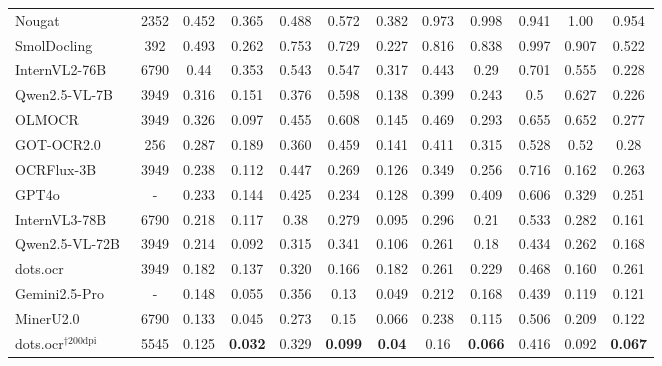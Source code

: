 \documentclass[11pt, a4paper, logo, copyright, nonumbering]{deepseek}
\begin{document}
\begin{CJK*}{UTF8}{gbsn}
\begin{table}[!t]
{\begin{tabular}{lccccccccccc}
            \midrule 
            Nougat~\cite{blecher2023nougat}& 2352 & 0.452 & 0.365 & 0.488 & 0.572 & 0.382 & 0.973 & 0.998 & 0.941 & 1.00 & 0.954\\
            SmolDocling~\cite{nassar2025smoldocling}& 392 & 0.493 & 0.262 & 0.753 & 0.729 & 0.227 & 0.816 & 0.838 & 0.997 & 0.907 & 0.522 \\
            InternVL2-76B~\cite{chen2024internvl2}& 6790 & 0.44 & 0.353 & 0.543 &  0.547 & 0.317 & 0.443 & 0.29 & 0.701 & 0.555 & 0.228  \\
            Qwen2.5-VL-7B~\cite{Qwen2.5-VL}& 3949 & 0.316 & 0.151 & 0.376 & 0.598 & 0.138 & 0.399 & 0.243 & 0.5 & 0.627 & 0.226 \\
            OLMOCR~\cite{poznanski2025olmocr}& 3949 & 0.326 & 0.097 & 0.455 & 0.608 & 0.145 & 0.469 & 0.293 & 0.655 & 0.652 & 0.277 \\
            GOT-OCR2.0~\cite{wei2024general}& 256 & 0.287 & 0.189 & 0.360 & 0.459 & 0.141 & 0.411 & 0.315 & 0.528 & 0.52 & 0.28 \\
            OCRFlux-3B~\cite{ocrflux}& 3949 & 0.238 & 0.112 & 0.447 & 0.269 &0.126 & 0.349 & 0.256 & 0.716 & 0.162 & 0.263 \\
            GPT4o~\cite{GPT4}& - & 0.233 & 0.144 & 0.425 & 0.234 & 0.128 & 0.399 & 0.409 & 0.606 & 0.329 & 0.251 \\
            InternVL3-78B~\cite{zhu2025internvl3}& 6790 & 0.218 & 0.117 & 0.38 & 0.279 & 0.095 & 0.296 & 0.21 & 0.533 & 0.282 & 0.161 \\
            Qwen2.5-VL-72B~\cite{Qwen2.5-VL}& 3949 & 0.214 & 0.092 & 0.315 & 0.341 & 0.106 & 0.261 & 0.18 & 0.434 & 0.262 & 0.168 \\
            dots.ocr~\cite{dots}& 3949 & 0.182 & 0.137 & 0.320 & 0.166 & 0.182 & 0.261 & 0.229 & 0.468 & 0.160 & 0.261 \\
            Gemini2.5-Pro~\cite{google_gemini_web}& - & 0.148 & 0.055  & 0.356 & 0.13 & 0.049 & 0.212 & 0.168 & 0.439 & 0.119 & 0.121 \\
            MinerU2.0~\cite{wang2024mineru}& 6790 & 0.133 & 0.045 & 0.273 & 0.15 & 0.066 & 0.238 & 0.115 & 0.506 & 0.209 & 0.122 \\
            dots.ocr{\color{black}$^{\dagger{\mathrm{200dpi}}}$}~\cite{dots}& 5545 & 0.125 & \bf{0.032} & 0.329 & \bf{0.099} & \bf{0.04} & 0.16 & \bf{0.066} & 0.416 & 0.092 & \bf{0.067} \\

\end{tabular}}
\end{table}
\end{CJK*}
\end{document}
